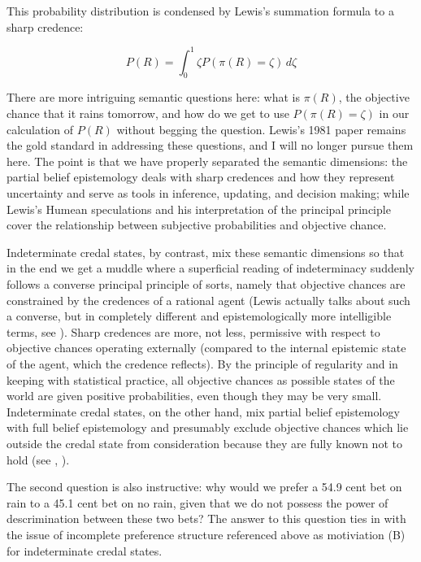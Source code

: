 \documentclass[11pt]{article}
\begin{document}
This probability distribution is condensed by Lewis's summation
formula to a sharp credence:

\begin{equation}
  \label{eq:s2}
  P(R)=\int_{0}^{1}\zeta{}P(\pi(R)=\zeta)\,d\zeta
\end{equation}

There are more intriguing semantic questions here: what is $\pi(R)$,
the objective chance that it rains tomorrow, and how do we get to use
$P(\pi(R)=\zeta)$ in our calculation of $P(R)$ without begging the
question. Lewis's 1981 paper  remains the gold standard in addressing these
questions, and I will no longer pursue them here. The point is that we
have properly separated the semantic dimensions: the partial belief
epistemology deals with sharp credences and how they represent
uncertainty and serve as tools in inference, updating, and decision
making; while Lewis's Humean speculations and his interpretation of
the principal principle cover the relationship between subjective
probabilities and objective chance.

Indeterminate credal states, by contrast, mix these semantic
dimensions so that in the end we get a muddle where a superficial
reading of indeterminacy suddenly follows a converse principal
principle of sorts, namely that objective chances are constrained by
the credences of a rational agent (Lewis actually talks about such a
converse, but in completely different and epistemologically more
intelligible terms, see ). Sharp credences are
more, not less, permissive with respect to objective chances operating
externally (compared to the internal epistemic state of the agent,
which the credence reflects). By the principle of regularity and in
keeping with statistical practice, all objective chances as possible
states of the world are given positive probabilities, even though they
may be very small. Indeterminate credal states, on the other hand, mix
partial belief epistemology with full belief epistemology and
presumably exclude objective chances which lie outside the credal
state from consideration because they are fully known not to hold (see
, ).

The second question is also instructive: why would we prefer a 54.9
cent bet on rain to a 45.1 cent bet on no rain, given that we do not
possess the power of descrimination between these two bets? The answer
to this question ties in with the issue of incomplete preference
structure referenced above as motiviation (B) for indeterminate credal
states. 
\end{document}
